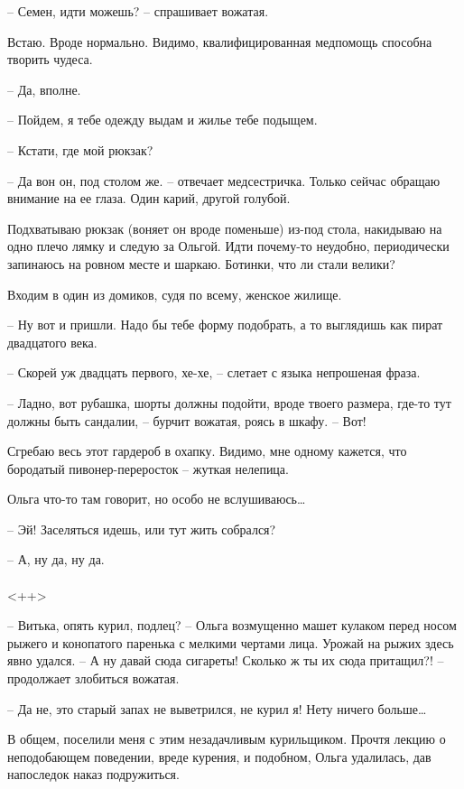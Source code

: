 \documentclass[a4paper]{book}
\begin{document}
-- Семен, идти можешь? -- спрашивает вожатая.

Встаю. Вроде нормально. Видимо, квалифицированная медпомощь способна творить чудеса. 

-- Да, вполне.

-- Пойдем, я тебе одежду выдам и жилье тебе подыщем. 

-- Кстати, где мой рюкзак? 

-- Да вон он, под столом же. -- отвечает медсестричка. Только сейчас обращаю внимание на ее глаза. Один карий, другой голубой.

Подхватываю рюкзак (воняет он вроде поменьше) из-под стола, накидываю на одно плечо лямку и следую за Ольгой. Идти почему-то неудобно, периодически запинаюсь на ровном месте и шаркаю. Ботинки, что ли стали велики?

Входим в один из домиков, судя по всему, женское жилище. 

-- Ну вот и пришли. Надо бы тебе форму подобрать, а то выглядишь как пират двадцатого века.


-- Скорей уж двадцать первого, хе-хе, -- слетает с языка непрошеная фраза.


-- Ладно, вот рубашка, шорты должны подойти, вроде твоего размера, где-то тут должны быть сандалии, -- бурчит вожатая, роясь в шкафу. -- Вот! 

Сгребаю весь этот гардероб в охапку. Видимо, мне одному кажется, что бородатый пивонер-переросток -- жуткая нелепица.

Ольга что-то там говорит, но особо не вслушиваюсь\ldots 


-- Эй! Заселяться идешь, или тут жить собрался?


-- А, ну да, ну да.
\paragraph{}<++>




-- Витька, опять курил, подлец? -- Ольга возмущенно машет кулаком перед носом рыжего и конопатого паренька с мелкими чертами лица. Урожай на рыжих здесь явно удался. -- А ну давай сюда сигареты! Сколько ж ты их сюда притащил?! -- продолжает злобиться вожатая. 

-- Да не, это старый запах не выветрился, не курил я! Нету ничего больше\ldots

В общем, поселили меня с этим незадачливым курильщиком. Прочтя лекцию о неподобающем поведении, вреде курения, и подобном, Ольга удалилась, дав напоследок наказ подружиться. 
\end{document}
